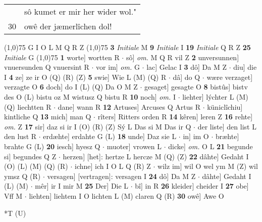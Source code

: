 \documentclass[8pt,a4paper,notitlepage]{article}
\begin{document}
\begin{table}[ht]
\begin{minipage}[t]{0.5\linewidth}
\begin{tabular}{rl}
 & sô kumet er mir her wider wol."\\ 
30 & owê der jæmerlîchen dol!\\ 
\end{tabular}
\scriptsize
\line(1,0){75} \newline
G I O L M Q R Z \newline
\line(1,0){75} \newline
\textbf{3} \textit{Initiale} M  \textbf{9} \textit{Initiale} I  \textbf{19} \textit{Initiale} Q R Z  \textbf{25} \textit{Initiale} G  \newline
\line(1,0){75} \newline
\textbf{1} worte] wortten R  $\cdot$ sô] \textit{om.} M Q R vil Z \textbf{2} unversunnen] vnuersunden Q vnuersint R  $\cdot$ vor im] \textit{om.} G  $\cdot$ lac] Gelac I \textbf{3} dô] Da M Z  $\cdot$ diu] die I \textbf{4} ze] ze ir O (Q) (R) (Z) \textbf{5} swie] Wie L (M) (Q) R  $\cdot$ dâ] do Q  $\cdot$ wære verzaget] verzagte O \textbf{6} doch] do I (L) (Q) Da O M Z  $\cdot$ gesaget] gesagte O \textbf{8} bistûs] bistv des O (L) bistu oz M wistusz Q bistu R \textbf{10} noch] \textit{om.} I  $\cdot$ liehter] lýchter L (M) (Q) liechtten R  $\cdot$ dane] wann R \textbf{12} Artuses] Arcuses Q Artus R  $\cdot$ küniclîchiu] kintliche Q \textbf{13} mich] man Q  $\cdot$ rîters] Ritters orden R \textbf{14} kêren] leren Z \textbf{16} rehte] \textit{om.} Z \textbf{17} sir] daz si ir I (O) (R) (Z) Sý L Das si M Das ir Q  $\cdot$ der liste] den list L den lust R  $\cdot$ erdæhte] erdahte G (L) \textbf{18} unde] Daz sie L  $\cdot$ in] im O  $\cdot$ bræhte] brahte G (L) \textbf{20} iesch] hyesz Q  $\cdot$ muoter] vrowen L  $\cdot$ dicke] \textit{om.} O L \textbf{21} begunde si] begundes Q Z  $\cdot$ herzen] [het]: hertze L hercze M (Q) (Z) \textbf{22} dâhte] Gedaht I (O) (L) (M) (Q) (R)  $\cdot$ ichne] ich I O L Q (R) Z  $\cdot$ wilz im] wil O wel ym M (Z) wil ymsz Q (R)  $\cdot$ versagen] [vertragen]: versagen I \textbf{24} dô] Da M Z  $\cdot$ dâhte] Gedaht I (L) (M)  $\cdot$ mêr] ir I mir M \textbf{25} Der] Die L  $\cdot$ bî] in R \textbf{26} kleider] cheider I \textbf{27} obe] Vff M  $\cdot$ liehten] liehtem I O lichten L (M) claren Q (R) \textbf{30} owê] Awe O \newline
\end{minipage}
\hspace{0.5cm}
\begin{minipage}[t]{0.5\linewidth}
\small
\begin{center}*T (U)
\end{center}
\begin{tabular}{rl}

\end{tabular}
\end{minipage}
\end{table}
\end{document}

